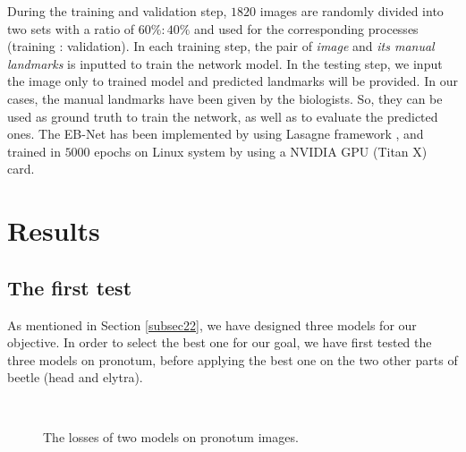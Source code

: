\documentclass[review]{elsarticle}
\begin{document}
During the training and validation step, $1820$ images are randomly divided into two sets with a ratio of $60\%:40\%$ and used for the corresponding processes (training : validation). In each training step, the pair of \textit{image} and \textit{its manual landmarks} is inputted to train the network model. In the testing step, we input the image only to trained model and predicted landmarks will be provided. In our cases, the manual landmarks have been given by the biologists. So, they can be used as ground truth to train the network, as well as to evaluate the predicted ones. The EB-Net has been implemented by using Lasagne framework \cite{lasagne}, and trained in $5000$ epochs on Linux system by using a NVIDIA GPU (Titan X) card.

\section{Results}
\label{sec3}
\subsection{The first test}
\label{subsec31}
As mentioned in Section \ref{subsec22}, we have designed three models for our objective. In order to select the best one for our goal, we have first tested the three models on pronotum, before applying the best one on the two other parts of beetle (head and elytra).

\begin{figure}[h!]
    \centering
    ~~
    \caption{The losses of two models on pronotum images.}
    \label{figdlosses}
\end{figure}
\end{document}

